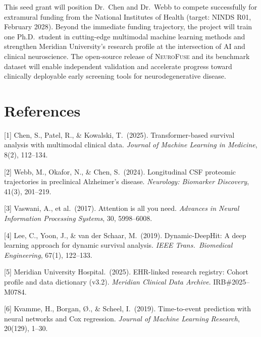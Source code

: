 \documentclass[10pt]{article}
\begin{document}
\vspace{4pt}

This seed grant will position Dr.\ Chen and Dr.\ Webb to compete successfully for extramural funding from the National Institutes of Health (target: NINDS R01, February 2028). Beyond the immediate funding trajectory, the project will train one Ph.D.\ student in cutting-edge multimodal machine learning methods and strengthen Meridian University's research profile at the intersection of AI and clinical neuroscience. The open-source release of \textsc{NeuroFuse} and its benchmark dataset will enable independent validation and accelerate progress toward clinically deployable early screening tools for neurodegenerative disease.

\section*{References}
{\footnotesize
\setlength{\parskip}{1pt}

[1] Chen, S., Patel, R., \& Kowalski, T.\ (2025). Transformer-based survival analysis with multimodal clinical data. \textit{Journal of Machine Learning in Medicine}, 8(2), 112--134.

[2] Webb, M., Okafor, N., \& Chen, S.\ (2024). Longitudinal CSF proteomic trajectories in preclinical Alzheimer's disease. \textit{Neurology: Biomarker Discovery}, 41(3), 201--219.

[3] Vaswani, A., et al.\ (2017). Attention is all you need. \textit{Advances in Neural Information Processing Systems}, 30, 5998--6008.

[4] Lee, C., Yoon, J., \& van der Schaar, M.\ (2019). Dynamic-DeepHit: A deep learning approach for dynamic survival analysis. \textit{IEEE Trans.\ Biomedical Engineering}, 67(1), 122--133.

[5] Meridian University Hospital.\ (2025). EHR-linked research registry: Cohort profile and data dictionary (v3.2). \textit{Meridian Clinical Data Archive}. IRB\#2025--M0784.

[6] Kvamme, H., Borgan, \O., \& Scheel, I.\ (2019). Time-to-event prediction with neural networks and Cox regression. \textit{Journal of Machine Learning Research}, 20(129), 1--30.

}
\end{document}
